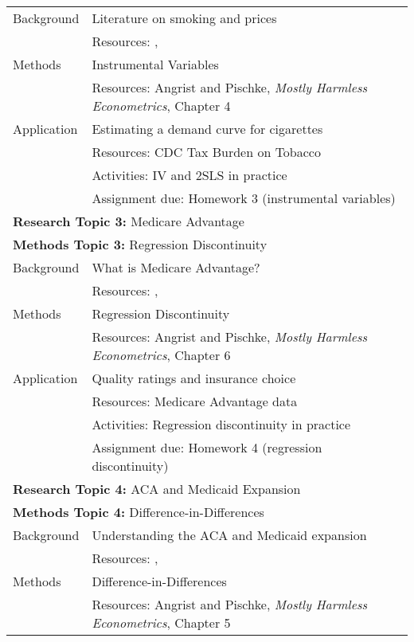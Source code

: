 \documentclass{article}
\begin{document}
\begin{longtable}{lp{13cm}}
  \hline\hline
  Background & Literature on smoking and prices\\
             & Resources: \cite{gruber2001}, \cite{ross2003} \\
  \hline
  Methods & Instrumental Variables \\
          & Resources: Angrist and Pischke, \textit{Mostly Harmless Econometrics}, Chapter 4 \\
  \hline
  Application & Estimating a demand curve for cigarettes \\
              & Resources: CDC Tax Burden on Tobacco \\
              & Activities: IV and 2SLS in practice \citep{ross2003} \\
              & Assignment due: Homework 3 (instrumental variables) \\
  \hline
  \multicolumn{2}{l}{\textbf{Research Topic 3:} Medicare Advantage} \\
  \multicolumn{2}{l}{\textbf{Methods Topic 3:} Regression Discontinuity} \\
  \hline\hline
  Background & What is Medicare Advantage? \\
             & Resources: \cite{darden2015}, \cite{gruber2017} \\
  \hline
  Methods & Regression Discontinuity \\
          & Resources: Angrist and Pischke, \textit{Mostly Harmless Econometrics}, Chapter 6 \\
  \hline
  Application & Quality ratings and insurance choice \\
              & Resources: Medicare Advantage data \\
              & Activities: Regression discontinuity in practice \citep{darden2015} \\
              & Assignment due: Homework 4 (regression discontinuity) \\
  \hline
  \multicolumn{2}{l}{\textbf{Research Topic 4:} ACA and Medicaid Expansion} \\
  \multicolumn{2}{l}{\textbf{Methods Topic 4:} Difference-in-Differences} \\
  \hline\hline
  Background & Understanding the ACA and Medicaid expansion\\
             & Resources: \cite{obama2016}, \cite{courtemanche2017} \\
  \hline
  Methods & Difference-in-Differences \\
          & Resources: Angrist and Pischke, \textit{Mostly Harmless Econometrics}, Chapter 5 \\

\end{longtable}
\end{document}
